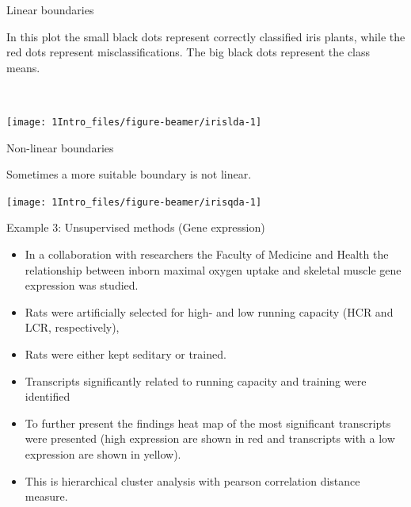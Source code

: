 \documentclass[ignorenonframetext,]{beamer}
\providecommand{\tightlist}{%
  \setlength{\itemsep}{0pt}\setlength{\parskip}{0pt}}
\begin{document}
\begin{frame}

\begin{block}{Linear boundaries}

In this plot the small black dots represent correctly classified iris
plants, while the red dots represent misclassifications. The big black
dots represent the class means.

~

\texttt{[image: 1Intro\_files/figure-beamer/irislda-1]}

\end{block}

\end{frame}

\begin{frame}

\begin{block}{Non-linear boundaries}

Sometimes a more suitable boundary is not linear.\\
\hspace*{0.333em}

\texttt{[image: 1Intro\_files/figure-beamer/irisqda-1]}

\end{block}

\end{frame}

\begin{frame}{Example 3: Unsupervised methods (Gene expression)}

\begin{itemize}
\tightlist
\item
  In a collaboration with researchers the Faculty of Medicine and Health
  the relationship between inborn maximal oxygen uptake and skeletal
  muscle gene expression was studied.
\item
  Rats were artificially selected for high- and low running capacity
  (HCR and LCR, respectively),
\item
  Rats were either kept seditary or trained.
\item
  Transcripts significantly related to running capacity and training
  were identified 
\item
  To further present the findings heat map of the most significant
  transcripts were presented (high expression are shown in red and
  transcripts with a low expression are shown in yellow).
\item
  This is hierarchical cluster analysis with pearson correlation
  distance measure.
\end{itemize}

\end{frame}
\end{document}
